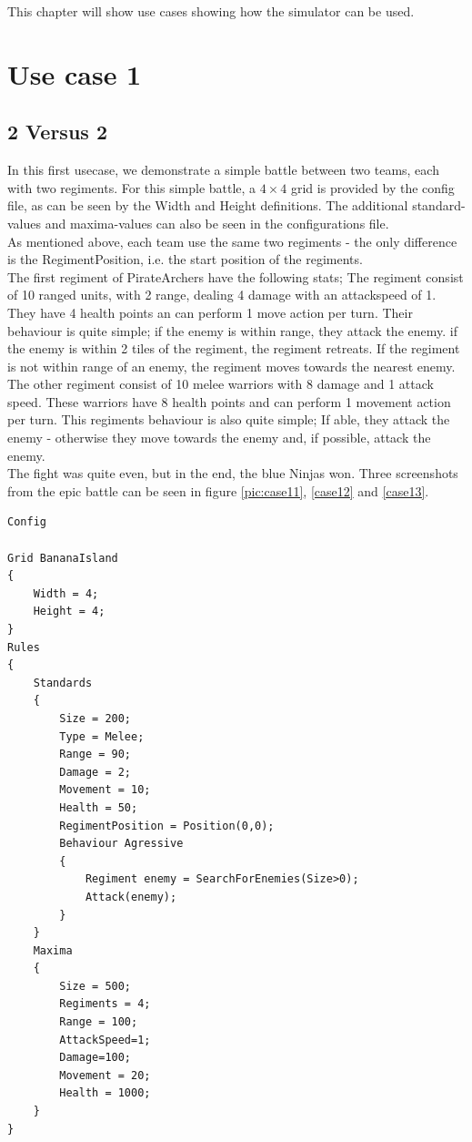 This chapter will show use cases showing how the simulator can be used.

\section{Use case 1}
\label{sec:usecase1}
	\subsection*{2 Versus 2}
	In this first usecase, we demonstrate a simple battle between two teams, each with two regiments. For this simple battle, a $4\times4$ grid is provided by the config file, as can be seen by the Width and Height definitions. The additional standard-values and maxima-values can also be seen in the configurations file.\\
	As mentioned above, each team use the same two regiments - the only difference is the RegimentPosition, i.e. the start position of the regiments. \\
	The first regiment of PirateArchers have the following stats; The regiment consist of 10 ranged units, with 2 range, dealing 4 damage with an attackspeed of 1. They have 4 health points an can perform 1 move action per turn. Their behaviour is quite simple; if the enemy is within range, they attack the enemy. if the enemy is within 2 tiles of the regiment, the regiment retreats. If the regiment is not within range of an enemy, the regiment moves towards the nearest enemy.\\
	The other regiment consist of 10 melee warriors with 8 damage and 1 attack speed. These warriors have 8 health points and can perform 1 movement action per turn. This regiments behaviour is also quite simple; If able, they attack the enemy - otherwise they move towards the enemy and, if possible, attack the enemy.\\
	The fight was quite even, but in the end, the blue Ninjas won. Three screenshots from the epic battle can be seen in figure \ref{pic:case11}, \ref{case12} and \ref{case13}.
\begin{lstlisting}
Config

Grid BananaIsland
{
	Width = 4;
	Height = 4;
}
Rules
{
	Standards
	{
		Size = 200;
		Type = Melee;
		Range = 90;
		Damage = 2;
		Movement = 10;
		Health = 50;
		RegimentPosition = Position(0,0);
		Behaviour Agressive
		{
			Regiment enemy = SearchForEnemies(Size>0);
			Attack(enemy);
		}
	}
	Maxima
	{
		Size = 500;
		Regiments = 4;
		Range = 100;
		AttackSpeed=1;
		Damage=100;
		Movement = 20;
		Health = 1000;
	}
}
\end{lstlisting}
